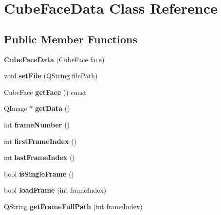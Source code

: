 \hypertarget{class_cube_face_data}{
\section{\-Cube\-Face\-Data \-Class \-Reference}
\label{class_cube_face_data}
}
\subsection*{\-Public \-Member \-Functions}
\begin{DoxyCompactItemize}
\item 
\hypertarget{class_cube_face_data_aed22dacebd9fe5a4c5782af7e7b6475b}{
{\bfseries \-Cube\-Face\-Data} (\-Cube\-Face face)}
\label{class_cube_face_data_aed22dacebd9fe5a4c5782af7e7b6475b}

\item 
\hypertarget{class_cube_face_data_a72a1028d22cb7a226ca435eb0c601349}{
void {\bfseries set\-File} (\-Q\-String file\-Path)}
\label{class_cube_face_data_a72a1028d22cb7a226ca435eb0c601349}

\item 
\hypertarget{class_cube_face_data_a0b8ade4132f98ace00744eec8c7907cd}{
\-Cube\-Face {\bfseries get\-Face} () const }
\label{class_cube_face_data_a0b8ade4132f98ace00744eec8c7907cd}

\item 
\hypertarget{class_cube_face_data_aecbef01dad7ce1e67a3288ea805e665a}{
\-Q\-Image $\ast$ {\bfseries get\-Data} ()}
\label{class_cube_face_data_aecbef01dad7ce1e67a3288ea805e665a}

\item 
\hypertarget{class_cube_face_data_a12768c2dfa6226bf583e6a061154c782}{
int {\bfseries frame\-Number} ()}
\label{class_cube_face_data_a12768c2dfa6226bf583e6a061154c782}

\item 
\hypertarget{class_cube_face_data_a70c31e19f28509b6a08928ef39018348}{
int {\bfseries first\-Frame\-Index} ()}
\label{class_cube_face_data_a70c31e19f28509b6a08928ef39018348}

\item 
\hypertarget{class_cube_face_data_af92676f0121125a7cc89ef9e296ba2fa}{
int {\bfseries last\-Frame\-Index} ()}
\label{class_cube_face_data_af92676f0121125a7cc89ef9e296ba2fa}

\item 
\hypertarget{class_cube_face_data_a1cf2e7ca56c49aa69684ac29503112e9}{
bool {\bfseries is\-Single\-Frame} ()}
\label{class_cube_face_data_a1cf2e7ca56c49aa69684ac29503112e9}

\item 
\hypertarget{class_cube_face_data_a8211bdaedac38f66193d6fdff0a4bc6c}{
bool {\bfseries load\-Frame} (int frame\-Index)}
\label{class_cube_face_data_a8211bdaedac38f66193d6fdff0a4bc6c}

\item 
\hypertarget{class_cube_face_data_a083aecc3d6b4ae76acaa947f143ba708}{
\-Q\-String {\bfseries get\-Frame\-Full\-Path} (int frame\-Index)}
\label{class_cube_face_data_a083aecc3d6b4ae76acaa947f143ba708}

\end{DoxyCompactItemize}


